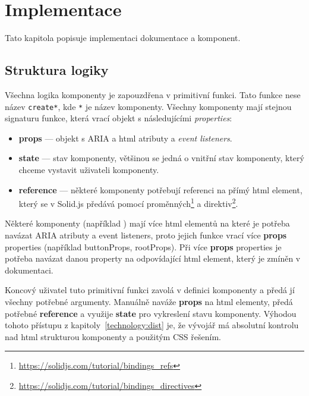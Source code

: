 \chapter{Implementace}

Tato kapitola popisuje implementaci dokumentace a komponent.

\section{Struktura logiky}\label{sec:structure}

Všechna logika komponenty je zapouzdřena v primitivní funkci.
Tato funkce nese název \texttt{create*}, kde \texttt{*} je název komponenty.
Všechny komponenty mají stejnou signaturu funkce, která vrací objekt s následujícími \textit{properties}:

\begin{itemize}
    \item \textbf{props} --- objekt s ARIA a \gls{html} atributy a \textit{event listeners}.
    \item \textbf{state} --- stav komponenty, většinou se jedná o vnitřní stav komponenty, který chceme vystavit uživateli komponenty.
    \item \textbf{reference} --- některé komponenty potřebují referenci na přímý \gls{html} element, který se v Solid.js předává pomocí proměnných\footnote{\url{https://solidjs.com/tutorial/bindings_refs}} a direktiv\footnote{\url{https://solidjs.com/tutorial/bindings_directives}}.
\end{itemize}

Některé komponenty (například ) mají více \gls{html} elementů na které je potřeba navázat ARIA atributy a event listeners, proto jejich funkce vrací více \textbf{props} properties (například buttonProps, rootProps).
Při více \textbf{props} properties je potřeba navázat danou property na odpovídající \gls{html} element, který je zmíněn v dokumentaci.

Koncový uživatel tuto primitivní funkci zavolá v definici komponenty a předá jí všechny potřebné argumenty.
Manuálně naváže \textbf{props} na \gls{html} elementy, předá potřebné \textbf{reference} a využije \textbf{state} pro vykreslení stavu komponenty.
Výhodou tohoto přístupu z kapitoly~\ref{technology:dist} je, že vývojář má absolutní kontrolu nad \gls{html} strukturou komponenty a použitým CSS řešením.
\clearpage

